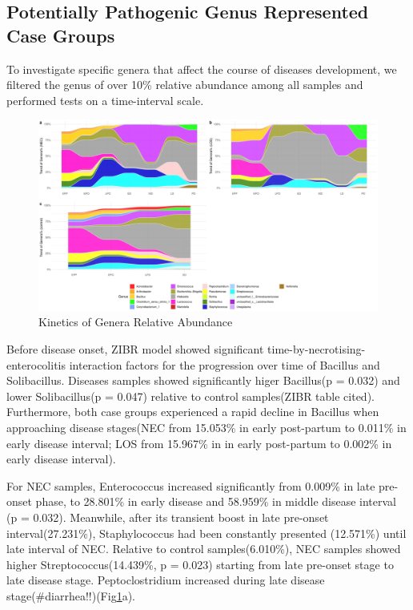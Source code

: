 \documentclass[fleqn,10pt,lineno]{wlpeerj} %
\begin{document}
  \subsection*{Potentially Pathogenic Genus Represented Case Groups}
  To investigate specific genera that affect the course of diseases development, we filtered the genus of over 10\% relative abundance among all samples and performed tests on a time-interval scale.
  \begin{figure}[ht]\centering
    \includegraphics[width=\linewidth]{figure/taxa-time.pdf}
    \caption{Kinetics of Genera Relative Abundance}
    \label{fig:taxa-time}
  \end{figure}


  \noindent
  Before disease onset, ZIBR model showed significant time-by-necrotising-enterocolitis interaction factors for the progression over time of Bacillus and Solibacillus. Diseases samples showed significantly higer Bacillus(p = 0.032) and lower Solibacillus(p = 0.047) relative to control samples(ZIBR table cited). Furthermore, both case groups experienced a rapid decline in Bacillus when approaching disease stages(NEC from 15.053\% in early post-partum to 0.011\% in early disease interval; LOS from 15.967\% in in early post-partum to 0.002\% in early disease interval).

  \noindent
  For NEC samples, Enterococcus increased significantly from 0.009\% in late pre-onset phase, to 28.801\% in early disease and 58.959\% in middle disease interval (p = 0.032). Meanwhile, after its transient boost in late pre-onset interval(27.231\%), Staphylococcus had been constantly presented (12.571\%) until late interval of NEC. Relative to control samples(6.010\%), NEC samples showed higher Streptococcus(14.439\%, p = 0.023) starting from late pre-onset stage to late disease stage. Peptoclostridium increased during late disease stage(\#diarrhea!!)(Fig\ref{fig:taxa-time}a).
\end{document}
